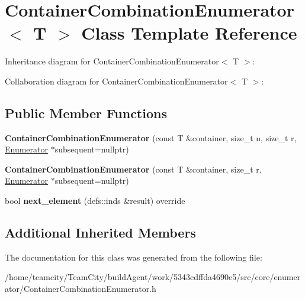 \hypertarget{classContainerCombinationEnumerator}{}\section{Container\+Combination\+Enumerator$<$ T $>$ Class Template Reference}
\label{classContainerCombinationEnumerator}


Inheritance diagram for Container\+Combination\+Enumerator$<$ T $>$\+:


Collaboration diagram for Container\+Combination\+Enumerator$<$ T $>$\+:
\subsection*{Public Member Functions}
\begin{DoxyCompactItemize}
\item 
{\bfseries Container\+Combination\+Enumerator} (const T \&container, size\+\_\+t n, size\+\_\+t r, \hyperlink{classEnumerator}{Enumerator} $\ast$subsequent=nullptr)\hypertarget{classContainerCombinationEnumerator_ad3766343b798d5e95a94aa90f05fccfe}{}\label{classContainerCombinationEnumerator_ad3766343b798d5e95a94aa90f05fccfe}

\item 
{\bfseries Container\+Combination\+Enumerator} (const T \&container, size\+\_\+t r, \hyperlink{classEnumerator}{Enumerator} $\ast$subsequent=nullptr)\hypertarget{classContainerCombinationEnumerator_aa0f06fe46f5a701b0c47aa4ca5e7531e}{}\label{classContainerCombinationEnumerator_aa0f06fe46f5a701b0c47aa4ca5e7531e}

\item 
bool {\bfseries next\+\_\+element} (defs\+::inds \&result) override\hypertarget{classContainerCombinationEnumerator_a5ae4cc19cd270528b56f5f9f2b9d5fd5}{}\label{classContainerCombinationEnumerator_a5ae4cc19cd270528b56f5f9f2b9d5fd5}

\end{DoxyCompactItemize}
\subsection*{Additional Inherited Members}


The documentation for this class was generated from the following file\+:\begin{DoxyCompactItemize}
\item 
/home/teamcity/\+Team\+City/build\+Agent/work/5343cdffda4690e5/src/core/enumerator/Container\+Combination\+Enumerator.\+h\end{DoxyCompactItemize}
